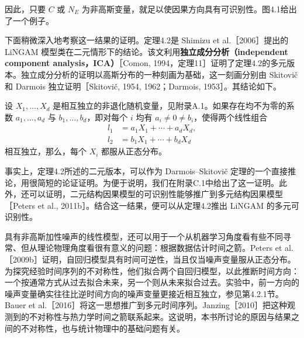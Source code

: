 

因此，只要 $C$ 或 $N_E$ 为非高斯变量，就足以使因果方向具有可识别性。图4.1给出了一个例子。

下面稍微深入地考察这一结果的证明。定理4.2是 Shimizu et al.［2006］提出的 LiNGAM 模型类在二元情形下的结论。该文利用\textbf{独立成分分析（independent component analysis，ICA）}［Comon, 1994，定理11］证明了定理4.2的多元版本。独立成分分析的证明以高斯分布的一种刻画为基础，这一刻画分别由 Skitovič 和 Darmois 独立证明［Skitovič, 1954, 1962；Darmois, 1953］。其结论如下。

\begin{theorem}
设 $X_1,\ldots,X_d$ 是相互独立的非退化随机变量，见附录A.1。如果存在均不为零的系数 $a_1,\ldots,a_d$ 与 $b_1,\ldots,b_d$，即对每个 $i$ 均有 $a_i\neq0\neq b_i$，使得两个线性组合
\[
 \begin{aligned}
 l_1&=a_1X_1+\cdots+a_dX_d,\\
 l_2&=b_1X_1+\cdots+b_dX_d
 \end{aligned}
\]
相互独立，那么，每个 $X_i$ 都服从正态分布。
\end{theorem}

事实上，定理4.2所述的二元版本，可以作为 Darmois--Skitovič 定理的一个直接推论，用很简短的论证证明。为便于说明，我们在附录C.1中给出了这一证明。此外，还可以证明，二元结构因果模型的可识别性能够推广到多元结构因果模型［Peters et al., 2011b］。结合这一结果，便可以从定理4.2推出 LiNGAM 的多元可识别性。

具有非高斯加性噪声的线性模型，还可以用于一个从机器学习角度看有些不同寻常、但从理论物理角度看很有意义的问题：根据数据估计时间之箭。Peters et al.［2009b］证明，自回归模型具有时间可逆性，当且仅当噪声变量服从正态分布。为探究经验时间序列的不对称性，他们拟合两个自回归模型，以此推断时间方向：一个按通常方式从过去拟合未来，另一个则从未来拟合过去。实验中，前一方向的噪声变量确实往往比逆时间方向的噪声变量更接近相互独立，参见第4.2.1节。Bauer et al.［2016］将这一思想推广到多元时间序列。Janzing［2010］把这种观测到的不对称性与热力学时间之箭联系起来。这说明，本书所讨论的原因与结果之间的不对称性，也与统计物理中的基础问题有关。
